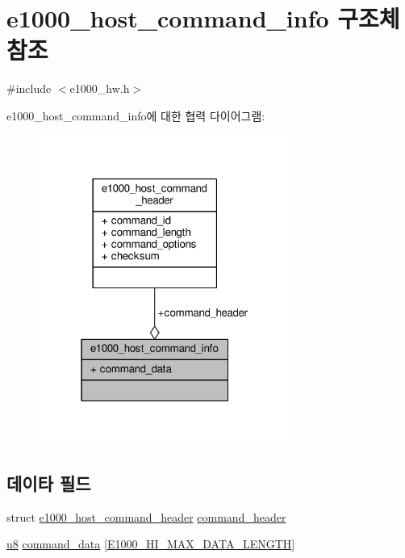\hypertarget{structe1000__host__command__info}{}\section{e1000\+\_\+host\+\_\+command\+\_\+info 구조체 참조}
\label{structe1000__host__command__info}


{\ttfamily \#include $<$e1000\+\_\+hw.\+h$>$}



e1000\+\_\+host\+\_\+command\+\_\+info에 대한 협력 다이어그램\+:
\nopagebreak
\begin{figure}[H]
\begin{center}
\leavevmode
\includegraphics[width=235pt]{structe1000__host__command__info__coll__graph}
\end{center}
\end{figure}
\subsection*{데이타 필드}
\begin{DoxyCompactItemize}
\item 
struct \hyperlink{structe1000__host__command__header}{e1000\+\_\+host\+\_\+command\+\_\+header} \hyperlink{structe1000__host__command__info_ad77d3ca84282194fcfb87feed3168db1}{command\+\_\+header}
\item 
\hyperlink{lib_2igb_2e1000__osdep_8h_a8baca7e76da9e0e11ce3a275dd19130c}{u8} \hyperlink{structe1000__host__command__info_a12026c993c83a0c740e9452e35cbb758}{command\+\_\+data} \mbox{[}\hyperlink{kmod_2igb_2e1000__hw_8h_ac68104e0d4f79520c674b367ee60d4ee}{E1000\+\_\+\+H\+I\+\_\+\+M\+A\+X\+\_\+\+D\+A\+T\+A\+\_\+\+L\+E\+N\+G\+TH}\mbox{]}
\end{DoxyCompactItemize}



